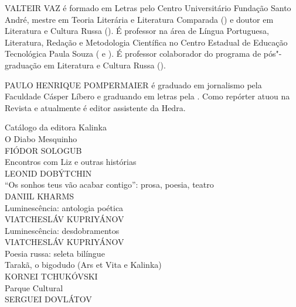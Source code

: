 \medskip

\noindent{}VALTEIR VAZ é formado em Letras pelo Centro Universitário Fundação Santo
André, mestre em Teoria Literária e Literatura Comparada () e doutor
em Literatura e Cultura Russa (). É professor na área de Língua
Portuguesa, Literatura, Redação e Metodologia Científica no Centro
Estadual de Educação Tecnológica Paula Souza ( e ). É professor
colaborador do programa de pós"-graduação em Literatura e Cultura Russa
().

\medskip

\noindent{}PAULO HENRIQUE POMPERMAIER é graduado em jornalismo pela Faculdade Cásper Líbero e graduando em letras pela . Como repórter atuou na Revista  e atualmente é editor assistente da Hedra.

\afterpage{\blankpage}

\newpage
\pagestyle{empty}
\MyriadPro

\noindent{}Catálogo da editora Kalinka\\[5pt]

\noindent{}O Diabo Mesquinho\\
FIÓDOR SOLOGUB\\

\noindent{}Encontros com Liz e outras histórias\\
LEONID DOBÝTCHIN\\

\noindent{}``Os sonhos teus vão acabar contigo'': prosa, poesia, teatro\\
DANIIL KHARMS\\

\noindent{}Luminescência: antologia poética\\
VIATCHESLÁV KUPRIYÁNOV\\

\noindent{}Luminescência: desdobramentos\\
VIATCHESLÁV KUPRIYÁNOV\\

\noindent{}Poesia russa: seleta bilíngue\\

\noindent{}Tarakã, o bigodudo (Ars et Vita e Kalinka)\\
KORNEI TCHUKÓVSKI\\

\noindent{}Parque Cultural\\
SERGUEI DOVLÁTOV\\

